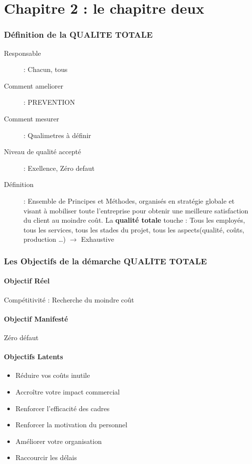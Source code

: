 \part{Chapitre 2 : le chapitre deux}

\section{Définition de la QUALITE TOTALE}

\begin{description}
\item[Responsable] : Chacun, tous
\item[Comment ameliorer] : PREVENTION
\item[Comment mesurer] : Qualimetres à définir
\item[Niveau de qualité accepté] : Exellence, Zéro defaut
\item[Définition] : Ensemble de Principes et Méthodes, organisés en stratégie globale et visant à mobiliser toute l’entreprise pour obtenir une meilleure satisfaction du client au moindre coût. La \textbf{qualité totale} touche : Tous les employés, tous les services, tous les stades du projet, tous les aspects(qualité, coûts, production …) $\rightarrow$ Exhaustive
\end{description}

\section{Les Objectifs de la démarche QUALITE TOTALE}

	\subsection{Objectif Réel}
Compétitivité : Recherche du moindre coût

	\subsection{Objectif Manifesté}
Zéro défaut

	\subsection{Objectifs Latents}
	\begin{itemize}
	\item Réduire vos coûts inutile
	\item Accroître votre impact commercial
	\item Renforcer l'efficacité des cadres
	\item Renforcer la motivation du personnel
	\item Améliorer votre organisation 
	\item Raccourcir les délais
	\end{itemize}

